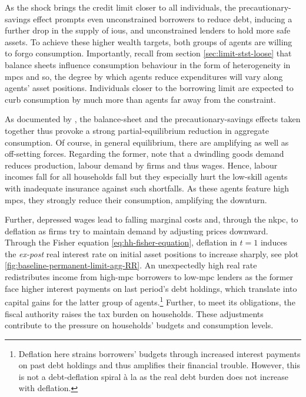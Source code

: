 \documentclass[a4paper,12pt]{article} %
\numberwithin{equation}{section} %
\numberwithin{figure}{section}
\numberwithin{table}{section}
\begin{document}
As the shock brings the credit limit closer to all individuals, the precautionary-savings effect prompts even unconstrained borrowers to reduce debt, inducing a further drop in the supply of \Gls{iou}s, and unconstrained lenders to hold more safe assets. To achieve these higher wealth targets, both groups of agents are willing to forgo consumption. Importantly, recall from section \ref{sec:limit-stst-loose} that balance sheets influence consumption behaviour in the form of heterogeneity in \Gls{mpc}s and so, the degree by which agents reduce expenditures will vary along agents' asset positions. Individuals closer to the borrowing limit are expected to curb consumption by much more than agents far away from the constraint.

As documented by \textcite{gl2017}, the balance-sheet and the precautionary-savings effects taken together thus provoke a strong partial-equilibrium reduction in aggregate consumption. Of course, in general equilibrium, there are amplifying as well as off-setting forces. Regarding the former, note that a dwindling goods demand reduces production, labour demand by firms and thus wages. Hence, labour incomes fall for all households fall but they especially hurt the low-skill agents with inadequate insurance against such shortfalls. As these agents feature high \Gls{mpc}s, they strongly reduce their consumption, amplifying the downturn.

Further, depressed wages lead to falling marginal costs and, through the \Gls{nkpc}, to deflation as firms try to maintain demand by adjusting prices downward. Through the Fisher equation \eqref{eq:hh-fisher-equation}, deflation in $t=1$ induces the \textit{ex-post} real interest rate on initial asset positions to increase sharply, see plot \ref{fig:baseline-permanent-limit-agg-RR}. An unexpectedly high real rate redistributes income from high-\Gls{mpc} borrowers to low-\Gls{mpc} lenders as the former face higher interest payments on last period's debt holdings, which translate into capital gains for the latter group of agents.\footnote{Deflation here strains borrowers' budgets through increased interest payments on past debt holdings and thus amplifies their financial trouble. However, this is not a debt-deflation spiral à la \textcite{fisher1933} as the real debt burden does not increase with deflation.} Further, to meet its obligations, the fiscal authority raises the tax burden on households. These adjustments contribute to the pressure on households' budgets and consumption levels.
\end{document}
